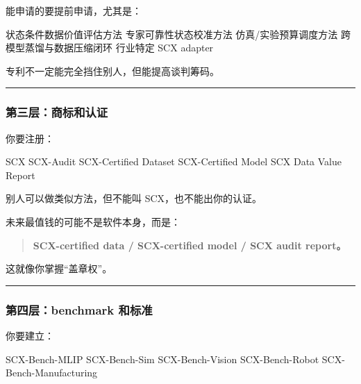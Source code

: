 \documentclass[
  12pt,
]{ctexart}
\newenvironment{Shaded}{}{}
\newcommand{\NormalTok}[1]{#1}
\begin{document}
能申请的要提前申请，尤其是：

\begin{Shaded}
\begin{Highlighting}[]
\NormalTok{状态条件数据价值评估方法}
\NormalTok{专家可靠性状态校准方法}
\NormalTok{仿真/实验预算调度方法}
\NormalTok{跨模型蒸馏与数据压缩闭环}
\NormalTok{行业特定 SCX adapter}
\end{Highlighting}
\end{Shaded}

专利不一定能完全挡住别人，但能提高谈判筹码。

\begin{center}\rule{0.5\linewidth}{0.5pt}\end{center}

\subsubsection{第三层：商标和认证}\label{ux7b2cux4e09ux5c42ux5546ux6807ux548cux8ba4ux8bc1}

你要注册：

\begin{Shaded}
\begin{Highlighting}[]
\NormalTok{SCX}
\NormalTok{SCX{-}Audit}
\NormalTok{SCX{-}Certified Dataset}
\NormalTok{SCX{-}Certified Model}
\NormalTok{SCX Data Value Report}
\end{Highlighting}
\end{Shaded}

别人可以做类似方法，但不能叫 SCX，也不能出你的认证。

未来最值钱的可能不是软件本身，而是：

\begin{quote}
\textbf{SCX-certified data / SCX-certified model / SCX audit report。}
\end{quote}

这就像你掌握``盖章权''。

\begin{center}\rule{0.5\linewidth}{0.5pt}\end{center}

\subsubsection{第四层：benchmark
和标准}\label{ux7b2cux56dbux5c42benchmark-ux548cux6807ux51c6}

你要建立：

\begin{Shaded}
\begin{Highlighting}[]
\NormalTok{SCX{-}Bench{-}MLIP}
\NormalTok{SCX{-}Bench{-}Sim}
\NormalTok{SCX{-}Bench{-}Vision}
\NormalTok{SCX{-}Bench{-}Robot}
\NormalTok{SCX{-}Bench{-}Manufacturing}
\end{Highlighting}
\end{Shaded}
\end{document}
